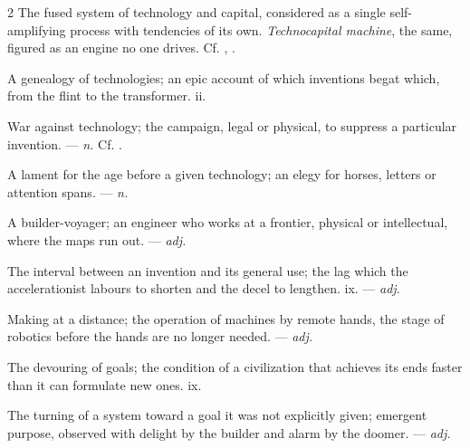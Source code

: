 \begin{multicols}{2}
 The fused system of technology and capital, considered as a single self-amplifying process with tendencies of its own. \textit{Technocapital machine}, the same, figured as an engine no one drives. Cf. , .

 A genealogy of technologies; an epic account of which inventions begat which, from the flint to the transformer.   ii.

 War against technology; the campaign, legal or physical, to suppress a particular invention. —  \textit{n.} Cf. .

 A lament for the age before a given technology; an elegy for horses, letters or attention spans. —  \textit{n.}

 A builder-voyager; an engineer who works at a frontier, physical or intellectual, where the maps run out. —  \textit{adj.}

 The interval between an invention and its general use; the lag which the accelerationist labours to shorten and the decel to lengthen.   ix. —  \textit{adj.}

 Making at a distance; the operation of machines by remote hands, the stage of robotics before the hands are no longer needed. —  \textit{adj.}

 The devouring of goals; the condition of a civilization that achieves its ends faster than it can formulate new ones.   ix.

 The turning of a system toward a goal it was not explicitly given; emergent purpose, observed with delight by the builder and alarm by the doomer. —  \textit{adj.}


\end{multicols}
